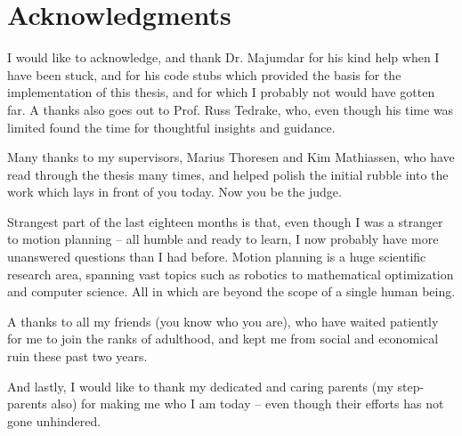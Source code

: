 \chapter{Acknowledgments}

I would like to acknowledge, and thank Dr. Majumdar for his kind help when I
have been stuck, and for his code stubs which provided the basis for the
implementation of this thesis, and for which I probably not would have gotten
far. A thanks also goes out to Prof. Russ Tedrake, who, even though his time was
limited found the time for thoughtful insights and guidance.

Many thanks to my supervisors, Marius Thoresen and Kim Mathiassen, who have read
through the thesis many times, and helped polish the initial rubble into the
work which lays in front of you today. Now you be the judge.

Strangest part of the last eighteen months is that, even though I was a stranger
to motion planning -- all humble and ready to learn, I now probably have more
unanswered questions than I had before. Motion planning is a huge scientific
research area, spanning vast topics such as robotics to mathematical optimization
and computer science. All in which are beyond the scope of a single human being.

A thanks to all my friends (you know who you are), who have waited patiently for
me to join the ranks of adulthood, and kept me from social and economical ruin
these past two years.

And lastly, I would like to thank my dedicated and caring parents (my
step-parents also) for making me who I am today -- even though their efforts has
not gone unhindered.
